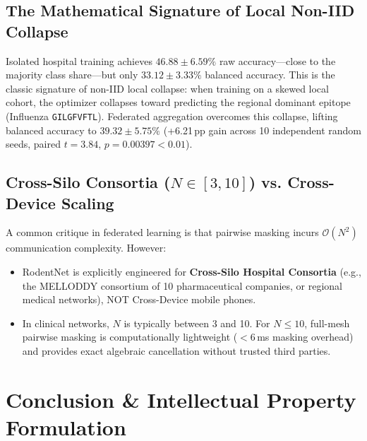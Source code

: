 \documentclass[11pt,a4paper]{report}
\begin{document}
\section{The Mathematical Signature of Local Non-IID Collapse}
Isolated hospital training achieves $46.88 \pm 6.59\%$ raw accuracy—close to the majority class share—but only $33.12 \pm 3.33\%$ balanced accuracy. This is the classic signature of non-IID local collapse: when training on a skewed local cohort, the optimizer collapses toward predicting the regional dominant epitope (Influenza \lstinline|GILGFVFTL|). Federated aggregation overcomes this collapse, lifting balanced accuracy to $39.32 \pm 5.75\%$ (+6.21\,pp gain across 10 independent random seeds, paired $t = 3.84$, $p = 0.00397 < 0.01$).

\section{Cross-Silo Consortia ($N \in [3, 10]$) vs. Cross-Device Scaling}
A common critique in federated learning is that pairwise masking incurs $\mathcal{O}(N^2)$ communication complexity. However:
\begin{itemize}[itemsep=2pt]
  \item RodentNet is explicitly engineered for \textbf{Cross-Silo Hospital Consortia} (e.g., the MELLODDY consortium of 10 pharmaceutical companies, or regional medical networks), NOT Cross-Device mobile phones.
  \item In clinical networks, $N$ is typically between 3 and 10. For $N \le 10$, full-mesh pairwise masking is computationally lightweight ($<6$\,ms masking overhead) and provides exact algebraic cancellation without trusted third parties.
\end{itemize}

\chapter{Conclusion \& Intellectual Property Formulation}
\label{chap:conclusion}
\end{document}
